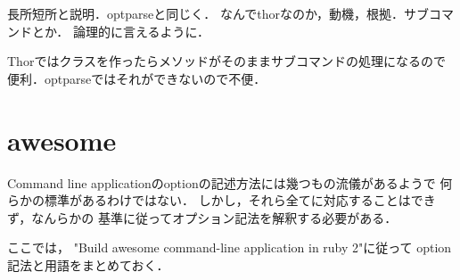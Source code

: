 長所短所と説明．optparseと同じく．
なんでthorなのか，動機，根拠．サブコマンドとか． 論理的に言えるように．

Thorではクラスを作ったらメソッドがそのままサブコマンドの処理になるので便利．optparseではそれができないので不便．

    \section{awesome}\label{awesome}

Command line applicationのoptionの記述方法には幾つもの流儀があるようで
何らかの標準があるわけではない．
しかし，それら全てに対応することはできず，なんらかの
基準に従ってオプション記法を解釈する必要がある．

ここでは， "Build awesome command-line application in ruby 2"に従って
option記法と用語をまとめておく．

    